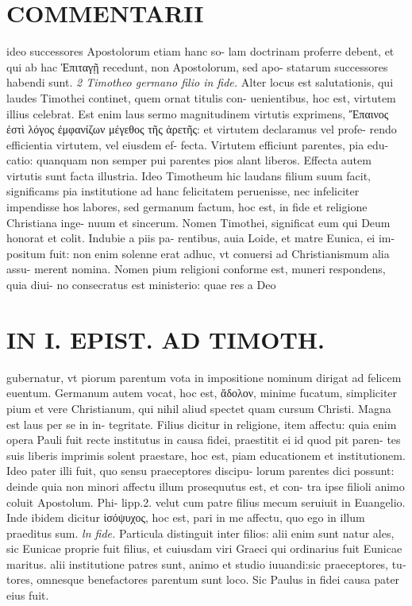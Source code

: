 \documentclass{article}
\begin{document}
\begin{pages}
\section*{COMMENTARII }
\marginpar{[ p.12 ]}\pstart ideo successores Apostolorum etiam hanc so- lam doctrinam proferre debent, et qui ab hac Ἐπιταγῇ  recedunt, non Apostolorum, sed apo- statarum successores habendi sunt.  \pend
\textit{2 Timotheo germano filio in fide. }\pstart Alter locus est salutationis, qui laudes Timothei continet, quem ornat titulis con- uenientibus, hoc est, virtutem illius celebrat. Est enim laus sermo magnitudinem virtutis exprimens, Ἔπαινος ἐστὶ λόγος ἐμφανίζων μέγεθος τῆς ἀρετῆς: et virtutem declaramus vel profe- rendo efficientia virtutem, vel eiusdem ef- fecta. Virtutem efficiunt parentes, pia edu- catio: quanquam non semper pui parentes pios alant liberos. Effecta autem virtutis sunt facta illustria. Ideo Timotheum hic laudans filium suum facit, significams pia institutione ad hanc felicitatem peruenisse, nec infeliciter impendisse hos labores, sed germanum factum, hoc est, in fide et religione Christiana inge- nuum et sincerum.  \pend\pstart Nomen Timothei, significat eum qui Deum honorat et colit. Indubie a piis pa- rentibus, auia Loide, et matre Eunica, ei im- positum fuit: non enim solenne erat adhuc, vt conuersi ad Christianismum alia assu- merent nomina. Nomen pium religioni conforme est, muneri respondens, quia diui- no consecratus est ministerio: quae res a Deo  \pend
\section*{IN I. EPIST. AD TIMOTH. }
\marginpar{[ p.13 ]}\pstart gubernatur, vt piorum parentum vota in impositione nominum dirigat ad felicem euentum.  \pend\pstart Germanum autem vocat, hoc est, ἄδολον, minime fucatum, simpliciter pium et vere Christianum, qui nihil aliud spectet quam cursum Christi. Magna est laus per se in in- tegritate.  \pend\pstart Filius dicitur in religione, item affectu: quia enim opera Pauli fuit recte institutus in causa fidei, praestitit ei id quod pit paren- tes suis liberis imprimis solent praestare, hoc est, piam educationem et institutionem. Ideo pater illi fuit, quo sensu praeceptores discipu- lorum parentes dici possunt: deinde quia non minori affectu illum prosequutus est, et con- tra ipse filioli animo coluit Apostolum. Phi- lipp.2. velut cum patre filius mecum seruiuit in Euangelio. Inde ibidem dicitur ἰσόψυχος, hoc est, pari in me affectu, quo ego in illum praeditus sum.  \pend
\textit{ln fide. }\pstart Particula distinguit inter filios: alii enim sunt natur ales, sic Eunicae proprie fuit filius, et cuiusdam viri Graeci qui ordinarius fuit Eunicae maritus. alii institutione patres sunt, animo et studio iuuandi:sic praeceptores, tu- tores, omnesque benefactores parentum sunt loco. Sic Paulus in fidei causa pater eius fuit.  \pend

\end{pages}
\end{document}
